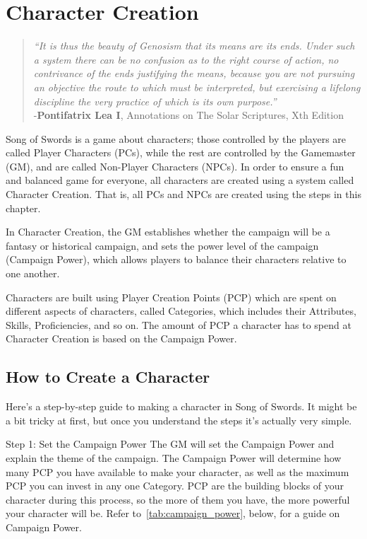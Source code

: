 \documentclass[oneside,11pt,english]{book}
\begin{document}
\chapter{Character Creation}\label{ch:charcreation}
\newpage
	\begin{quote}
		\emph{“It is thus the beauty of Genosism that its means are its ends. Under such a system there can be no confusion as to the right course of action, no contrivance of the ends justifying the means, because you are not pursuing an objective the route to which must be interpreted, but exercising a lifelong discipline the very practice of which is its own purpose.”}\\ 

		\hfill -\textbf{Pontifatrix Lea I}, Annotations on The Solar Scriptures, Xth Edition 
	\end{quote} 
Song of Swords is a game about characters; those controlled by the players are called Player Characters 
(PCs), while the rest are controlled by the Gamemaster (GM), and are called Non-Player Characters 
(NPCs). In order to ensure a fun and balanced game for everyone, all characters are created using a 
system called Character Creation. That is, all PCs and NPCs are created using the steps in this chapter. 

 
In Character Creation, the GM establishes whether the campaign will be a fantasy or historical campaign, 
and sets the power level of the campaign (Campaign Power), which allows players to balance their 
characters relative to one another. 

 
Characters are built using Player Creation Points (PCP) which are spent on different aspects of characters, 
called Categories, which includes their Attributes, Skills, Proficiencies, and so on. The amount of PCP a 
character has to spend at Character Creation is based on the Campaign Power. 

 
\section{How to Create a Character}
Here’s a step-by-step guide to making a character in Song of Swords. It might be a bit tricky at first, but 
once you understand the steps it’s actually very simple. 

Step 1: Set the Campaign Power 
The GM will set the Campaign Power and explain the theme of the campaign. The Campaign Power will 
determine how many PCP you have available to make your character, as well as the maximum PCP you 
can invest in any one Category. PCP are the building blocks of your character during this process, so the 
more of them you have, the more powerful your character will be. Refer to~\autoref{tab:campaign_power}, below, for a guide 
on Campaign Power. 
 
\end{document}
